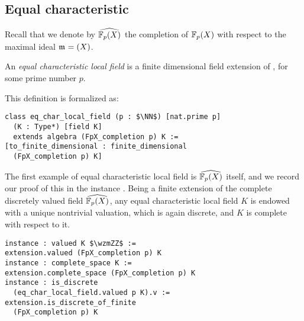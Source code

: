 \documentclass[sigplan,screen]{acmart}
\begin{document}
\subsection{Equal characteristic}\label{subsec:eq_char}
Recall that we denote by $\FpXCompl$ the completion of $\mathbb{F}_{p}(X)$ with respect to the maximal ideal $\maxid[\empty]=(X)$.
\begin{definition}\label{def:eq_char_local_field}
An \emph{equal characteristic local field} is a finite dimensional field extension of \FpXCompl, for some prime number $p$.
\end{definition}
This definition is formalized as\href{https://github.com/mariainesdff/local_fields_journal/blob/0b408ff3af36e18f991f9d4cb87be3603cfc3fc3/src/eq_characteristic/basic.lean#L359}{\extlink}:
\begin{lstlisting}
class eq_char_local_field (p : $\NN$) [nat.prime p]
  (K : Type*) [field K] 
  extends algebra (FpX_completion p) K :=
[to_finite_dimensional : finite_dimensional 
  (FpX_completion p) K]
\end{lstlisting}

The first example of equal characteristic local field is $\FpXCompl$ itself, and we record our proof of this in the instance \href{https://github.com/mariainesdff/local_fields_journal/blob/0b408ff3af36e18f991f9d4cb87be3603cfc3fc3/src/eq_characteristic/basic.lean#L440}{\extlink}. Being a finite extension of the complete discretely valued field $\FpXCompl$, any equal characteristic  local field $K$ is endowed with a unique nontrivial valuation, which is again discrete, and $K$ is complete with respect to it.
\begin{lstlisting}
instance : valued K $\wzmZZ$ := 
extension.valued (FpX_completion p) K
instance : complete_space K := 
extension.complete_space (FpX_completion p) K
instance : is_discrete 
  (eq_char_local_field.valued p K).v := 
extension.is_discrete_of_finite 
  (FpX_completion p) K
\end{lstlisting}
\end{document}

